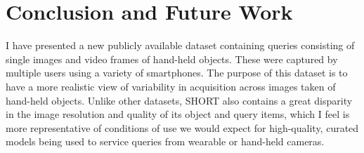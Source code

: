 


\section{Conclusion and Future Work} \label{sec:conclusions}

I have presented a new publicly available  dataset containing queries consisting of single images and video frames of hand-held objects.  These were captured by multiple users using a variety of smartphones. The purpose of this dataset is to have a more realistic view of variability in acquisition across images taken of hand-held objects. Unlike other datasets, SHORT also contains a great disparity in the image resolution and quality of its object and query items, which I feel is more representative of conditions of use we would expect for high-quality, curated models being used to service queries from wearable or hand-held cameras.


